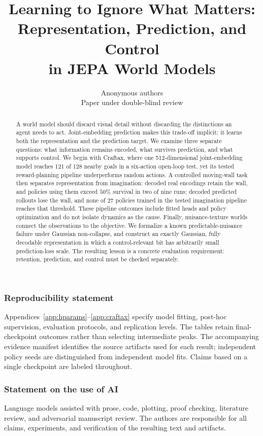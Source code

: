 \documentclass{article}
\title{Learning to Ignore What Matters:\\Representation, Prediction, and Control\\in JEPA World Models}
\author{Anonymous authors\\Paper under double-blind review}
\theoremstyle{remark}
\begin{document}
\maketitle
{}
\begin{abstract}
A world model should discard visual detail without discarding the distinctions an agent needs to act.
Joint-embedding prediction makes this trade-off implicit: it learns both the representation and the
prediction target. We examine three separate questions: what information remains encoded, what
survives prediction, and what supports control. We begin with Craftax, where one 512-dimensional
joint-embedding model reaches 121 of 128 nearby goals in a six-action open-loop test, yet its tested
reward-planning pipeline underperforms random actions. A controlled moving-wall task then separates
representation from imagination: decoded real encodings retain the wall, and policies using them
exceed $50\%$ survival in two of nine runs; decoded predicted rollouts lose the wall, and none of 27 policies
trained in the tested imagination pipeline reaches that threshold. These pipeline outcomes include fitted heads
and policy optimization and do not isolate dynamics as the cause. Finally, nuisance-texture worlds
connect the observations to the objective. We formalize a known predictable-nuisance failure under
Gaussian non-collapse, and construct an exactly Gaussian, fully decodable representation in which
a control-relevant bit has arbitrarily small prediction-loss scale. The resulting lesson is a concrete
evaluation requirement: retention, prediction, and control must be checked separately.
\end{abstract}






\FloatBarrier





\subsubsection*{Reproducibility statement}
Appendices~\ref{app:hparams}--\ref{app:craftax} specify model fitting, post-hoc supervision,
evaluation protocols, and replication levels. The tables retain final-checkpoint outcomes rather
than selecting intermediate peaks. The accompanying evidence manifest identifies the source
artifacts used for each result; independent policy seeds are distinguished from independent model
fits. Claims based on a single checkpoint are labeled throughout.

\subsubsection*{Statement on the use of AI}
Language models assisted with prose, code, plotting, proof checking, literature review, and
adversarial manuscript review. The authors are responsible for all claims, experiments, and
verification of the resulting text and artifacts.

\clearpage


\clearpage
\appendix

\end{document}
